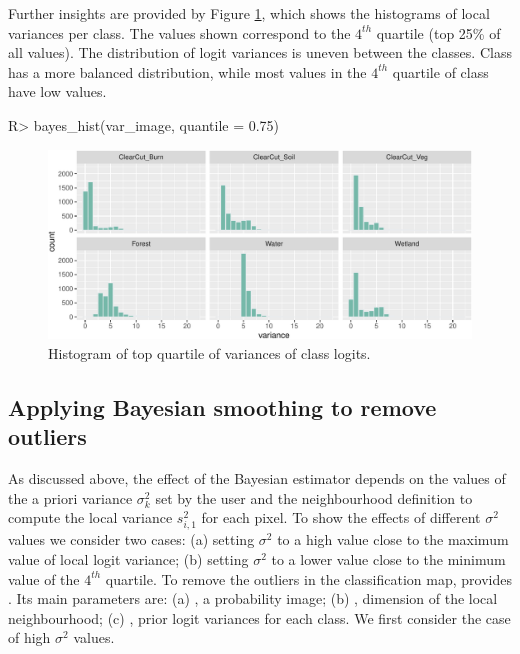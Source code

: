 \documentclass[
  shortnames]{jss}
\begin{document}
Further insights are provided by Figure \ref{fig:vhist}, which shows the histograms of local variances per class. The values shown correspond to the \(4^{th}\) quartile (top 25\% of all values). The distribution of logit variances is uneven between the classes. Class  has a more balanced distribution, while most values in the \(4^{th}\) quartile of class  have low values.

\begin{CodeChunk}
\begin{CodeInput}
R> bayes_hist(var_image, quantile = 0.75)
\end{CodeInput}
\begin{figure}[h]

{\centering \includegraphics{Bayesian_smoothing_JSS_files/figure-latex/vhist-1} 

}

\caption[Histogram of top quartile of variances of class logits]{Histogram of top quartile of variances of class logits.}\label{fig:vhist}
\end{figure}
\end{CodeChunk}

\hypertarget{applying-bayesian-smoothing-to-remove-outliers}{%
\subsection{Applying Bayesian smoothing to remove outliers}\label{applying-bayesian-smoothing-to-remove-outliers}}

As discussed above, the effect of the Bayesian estimator depends on the values of the a priori variance \(\sigma^2_{k}\) set by the user and the neighbourhood definition to compute the local variance \(s^2_{i,1}\) for each pixel. To show the effects of different \(\sigma^2\) values we consider two cases: (a) setting \(\sigma^2\) to a high value close to the maximum value of local logit variance; (b) setting \(\sigma^2\) to a lower value close to the minimum value of the \(4^{th}\) quartile. To remove the outliers in the classification map,  provides . Its main parameters are: (a) , a probability image; (b) , dimension of the local neighbourhood; (c) , prior logit variances for each class. We first consider the case of high \(\sigma^2\) values.
\end{document}
